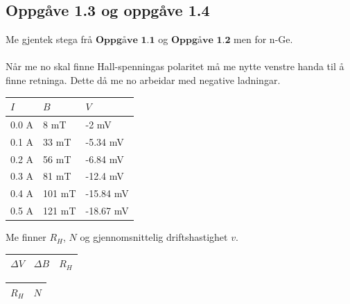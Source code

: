 \documentclass[11pt, a4paper]{article}
\begin{document}
  \subsection*{Oppgåve 1.3 og oppgåve 1.4}
    Me gjentek stega frå $\textbf{Oppgåve 1.1}$ og $\textbf{Oppgåve 1.2}$ men for n-Ge. \\ \\
    Når me no skal finne Hall-spenningas polaritet må me nytte venstre handa til å finne retninga. Dette då me no arbeidar med negative ladningar.
    \begin{center}
      \begin{tabular}{|l|l||l|}
        \hline
        $I$ & $B$ & $V$ \\
        \hline
        0.0 A & 8 mT & -2 mV \\
        0.1 A & 33 mT & -5.34 mV \\
        0.2 A & 56 mT & -6.84 mV \\
        0.3 A & 81 mT & -12.4 mV \\
        0.4 A & 101 mT & -15.84 mV \\
        0.5 A & 121 mT & -18.67 mV \\
        \hline
      \end{tabular}
    \end{center}
    Me finner $R_{H}$, $N$ og gjennomsnittelig driftshastighet $v$.

    \begin{center}
      \begin{tabular}{|l|l||l|}
        \hline
        $\Delta V$ & $\Delta B$ & $R_{H}$ \\
        \hline
        
        \hline
      \end{tabular}
    \end{center}

    \begin{center}
      \begin{tabular}{|l||l|}
        \hline
        $R_{H}$ & $N$ \\
        \hline
        
        \hline
      \end{tabular}
    \end{center}

    \begin{align*}
      
    \end{align*}
\end{document}
